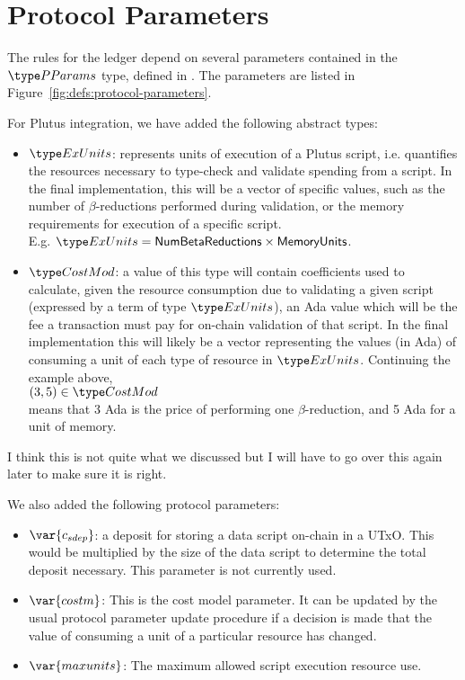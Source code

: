 \section{Protocol Parameters}
\label{sec:protocol-parameters}

The rules for the ledger depend on several parameters contained in the $\PParams$ type,
defined in \cite{byron_ledger_spec}.
The parameters are listed in Figure~\ref{fig:defs:protocol-parameters}.

For Plutus integration, we have added the following abstract types:

\begin{itemize}
\item $\ExUnits$: represents units of execution of
a Plutus script, i.e. quantifies the resources necessary to type-check
and validate spending from a script. In the final implementation, this will
be a vector of specific values, such as the number of $\beta$-reductions performed
during validation, or the memory requirements for execution of a specific script. \\
E.g. $\ExUnits = \mathsf{NumBetaReductions} \times \mathsf{MemoryUnits}$.

\item $\CostMod$: a value of this type will contain coefficients used to calculate,
given the resource
consumption due to validating a given script (expressed by a term of type $\ExUnits$),
an Ada value which will be the fee a transaction must pay for on-chain
validation of that script.
In the final implementation this will likely be a vector representing the values
(in Ada) of consuming a unit of each type of resource in $\ExUnits$.
Continuing the example above, \\
$(3,5) \in \CostMod$ \\
means that 3 Ada is the price of performing one $\beta$-reduction, and
5 Ada for a unit of memory.
\end{itemize}

\begin{note}
   I think this is not quite what we discussed but I will have to go over this
   again later to make sure it is right.
\end{note}

We also added the following protocol parameters:

\begin{itemize}
  \item $\var{c_{sdep}}$: a deposit for storing a data script on-chain in
  a UTxO. This would be multiplied by the size of the data script to determine
  the total deposit necessary. This parameter is not currently used.

  \item $\var{costm}$: This is the cost model parameter. It can be updated by
  the usual protocol parameter update procedure if a decision is made that
  the value of consuming a unit of a particular resource has changed.

  \item $\var{maxunits}$: The maximum allowed script execution resource use.
\end{itemize}

